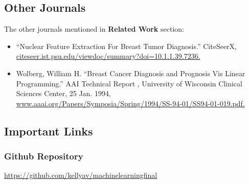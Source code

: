 \documentclass[15pt]{cup-pan}
\begin{document}
\begin{adjustwidth*}{-1.5in}{-0in}
\begin{itemize}
\end{itemize}  

\bigskip
\bigskip

\subsection{Other Journals}
The other journals mentioned in \textbf{Related Work} section:

\begin{itemize}

  \item “Nuclear Feature Extraction For Breast Tumor Diagnosis.” CiteSeerX, \url{citeseer.ist.psu.edu/viewdoc/summary?doi=10.1.1.39.7236.} 
 
  \bigskip

  \item Wolberg, William H. “Breast Cancer Diagnosis and Prognosis Vis Linear Programming.” AAI Technical Report , University of Wisconsin Clinical Sciences Center, 25 Jan. 1994, \url{www.aaai.org/Papers/Symposia/Spring/1994/SS-94-01/SS94-01-019.pdf.} 
  
\end{itemize}

\bigskip

\subsection{Important Links}

\subsubsection{Github Repository}
  
\url{https://github.com/kellyav/machinelearningfinal} 


\printbibliography


\end{adjustwidth*}
\end{document}
